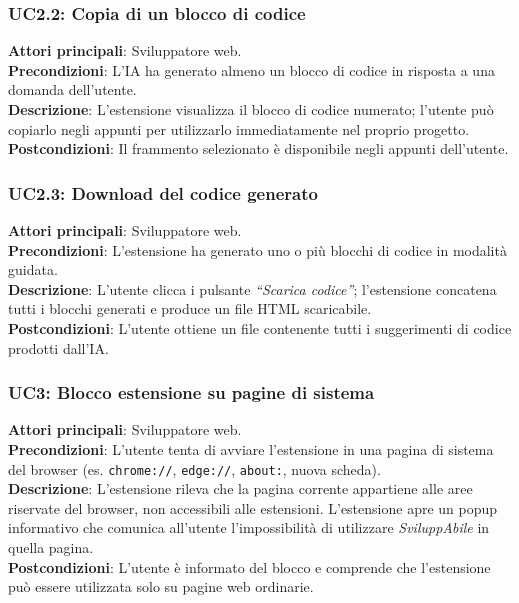 \subsubsection*{UC2.2: Copia di un blocco di codice}
\noindent \textbf{Attori principali}: Sviluppatore web.\\
\textbf{Precondizioni}: L’IA ha generato almeno un blocco di codice in risposta a una domanda dell’utente.\\
\textbf{Descrizione}: L’estensione visualizza il blocco di codice numerato; l’utente può copiarlo negli appunti per utilizzarlo immediatamente nel proprio progetto.\\
\textbf{Postcondizioni}: Il frammento selezionato è disponibile negli appunti dell’utente.\\

\subsubsection*{UC2.3: Download del codice generato}
\noindent \textbf{Attori principali}: Sviluppatore web.\\
\textbf{Precondizioni}: L’estensione ha generato uno o più blocchi di codice in modalità guidata.\\
\textbf{Descrizione}: L’utente clicca i pulsante \textit{“Scarica codice”}; l’estensione concatena tutti i blocchi generati e produce un file HTML scaricabile.\\
\textbf{Postcondizioni}: L’utente ottiene un file contenente tutti i suggerimenti di codice prodotti dall’IA.\\


\subsubsection*{UC3: Blocco estensione su pagine di sistema}
\noindent \textbf{Attori principali}: Sviluppatore web.\\
\textbf{Precondizioni}: L’utente tenta di avviare l’estensione in una pagina di sistema del browser (es. \texttt{chrome://}, \texttt{edge://}, \texttt{about:}, nuova scheda).\\
\textbf{Descrizione}: L’estensione rileva che la pagina corrente appartiene alle aree riservate del browser, non accessibili alle estensioni. L'estensione apre un popup informativo che comunica all’utente l’impossibilità di utilizzare \textit{SviluppAbile} in quella pagina.\\
\textbf{Postcondizioni}: L’utente è informato del blocco e comprende che l’estensione può essere utilizzata solo su pagine web ordinarie.\\

